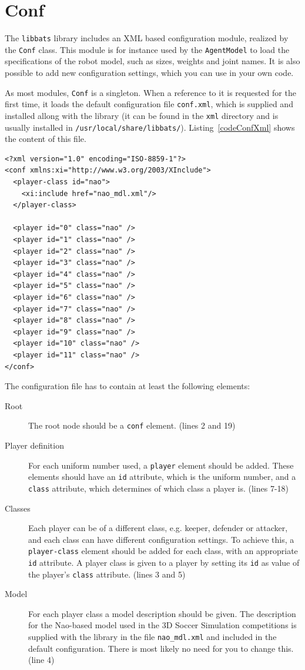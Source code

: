 \section{Conf}

\lstset{numbers=left,numberstyle=\scriptsize}

The {\tt libbats} library includes an XML based configuration module, realized by the {\tt Conf} class. This module is for instance used by the {\tt AgentModel} to load the specifications of the robot model, such as sizes, weights and joint names. It is also possible to add new configuration settings, which you can use in your own code.

As most modules, {\tt Conf} is a singleton. When a reference to it is requested for the first time, it loads the default configuration file {\tt conf.xml}, which is supplied and installed allong with the library (it can be found in the {\tt xml} directory and is usually installed in {\tt /usr/local/share/libbats/}). Listing~\ref{codeConfXml} shows the content of this file.

\begin{lstlisting}[float=b,caption={\tt conf.xml},label=codeConfXml,frame=single]
<?xml version="1.0" encoding="ISO-8859-1"?>
<conf xmlns:xi="http://www.w3.org/2003/XInclude">  
  <player-class id="nao">
    <xi:include href="nao_mdl.xml"/>
  </player-class>

  <player id="0" class="nao" />
  <player id="1" class="nao" />
  <player id="2" class="nao" />
  <player id="3" class="nao" />
  <player id="4" class="nao" />
  <player id="5" class="nao" />
  <player id="6" class="nao" />
  <player id="7" class="nao" />
  <player id="8" class="nao" />
  <player id="9" class="nao" />
  <player id="10" class="nao" />
  <player id="11" class="nao" />
</conf>    
\end{lstlisting}

The configuration file has to contain at least the following elements:
\begin{description}
\item[Root] The root node should be a {\tt conf} element. (lines 2 and 19)
\item[Player definition] For each uniform number used, a {\tt player} element should be added. These elements should have an {\tt id} attribute, which is the uniform number, and a {\tt class} attribute, which determines of which class a player is. (lines 7-18)
\item[Classes] Each player can be of a different class, e.g. keeper, defender or attacker, and each class can have different configuration settings. To achieve this, a {\tt player-class} element should be added for each class, with an appropriate {\tt id} attribute. A player class is given to a player by setting its {\tt id} as value of the player's {\tt class} attribute. (lines 3 and 5)
\item[Model] For each player class a model description should be given. The description for the Nao-based model used in the 3D Soccer Simulation competitions is supplied with the library in the file {\tt nao\_mdl.xml} and included in the default configuration. There is most likely no need for you to change this. (line 4)
\end{description}


